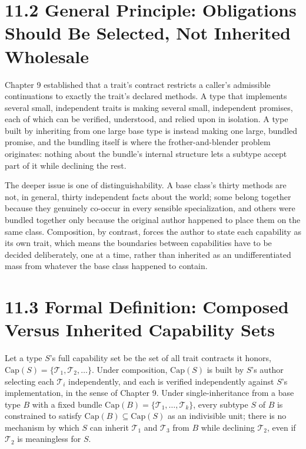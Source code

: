 \documentclass[11pt]{book}
\begin{document}
\section*{11.2 General Principle: Obligations Should Be Selected, Not Inherited Wholesale}

Chapter 9 established that a trait's contract restricts a caller's admissible continuations to exactly the trait's declared methods. A type that implements several small, independent traits is making several small, independent promises, each of which can be verified, understood, and relied upon in isolation. A type built by inheriting from one large base type is instead making one large, bundled promise, and the bundling itself is where the frother-and-blender problem originates: nothing about the bundle's internal structure lets a subtype accept part of it while declining the rest.

The deeper issue is one of distinguishability. A base class's thirty methods are not, in general, thirty independent facts about the world; some belong together because they genuinely co-occur in every sensible specialization, and others were bundled together only because the original author happened to place them on the same class. Composition, by contrast, forces the author to state each capability as its own trait, which means the boundaries between capabilities have to be decided deliberately, one at a time, rather than inherited as an undifferentiated mass from whatever the base class happened to contain.

\section*{11.3 Formal Definition: Composed Versus Inherited Capability Sets}

Let a type $S$'s full capability set be the set of all trait contracts it honors, $\mathrm{Cap}(S) = \{ \mathcal{T}_1, \mathcal{T}_2, \ldots \}$. Under composition, $\mathrm{Cap}(S)$ is built by $S$'s author selecting each $\mathcal{T}_i$ independently, and each is verified independently against $S$'s implementation, in the sense of Chapter 9. Under single-inheritance from a base type $B$ with a fixed bundle $\mathrm{Cap}(B) = \{ \mathcal{T}_1, \ldots, \mathcal{T}_k \}$, every subtype $S$ of $B$ is constrained to satisfy $\mathrm{Cap}(B) \subseteq \mathrm{Cap}(S)$ as an indivisible unit; there is no mechanism by which $S$ can inherit $\mathcal{T}_1$ and $\mathcal{T}_3$ from $B$ while declining $\mathcal{T}_2$, even if $\mathcal{T}_2$ is meaningless for $S$.
\end{document}
